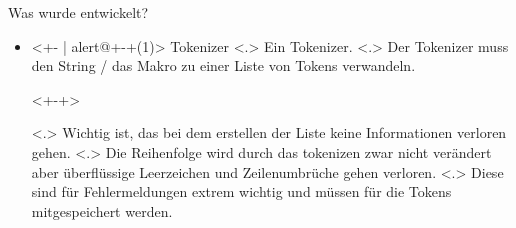   \begin{frame}{Was wurde entwickelt?}
    \begin{itemize}[<+- | alert@+>]
      \item<+- | alert@+-+(1)>
        Tokenizer
            \note[item]<.>{
              Ein Tokenizer.
            }
            \note[item]<.>{
              Der Tokenizer muss den String / das Makro zu einer Liste von Tokens verwandeln.
            }
        \begin{uncoverenv}<+-+>%
        \end{uncoverenv}%
            \note[item]<.>{
              Wichtig ist, das bei dem erstellen der Liste keine Informationen verloren gehen.
            }
            \note[item]<.>{
              Die Reihenfolge wird durch das tokenizen zwar nicht verändert aber überflüssige Leerzeichen und Zeilenumbrüche gehen verloren.
            }
            \note[item]<.>{
              Diese sind für Fehlermeldungen extrem wichtig und müssen für die Tokens mitgespeichert werden.
            }


\end{itemize}
\end{frame}
